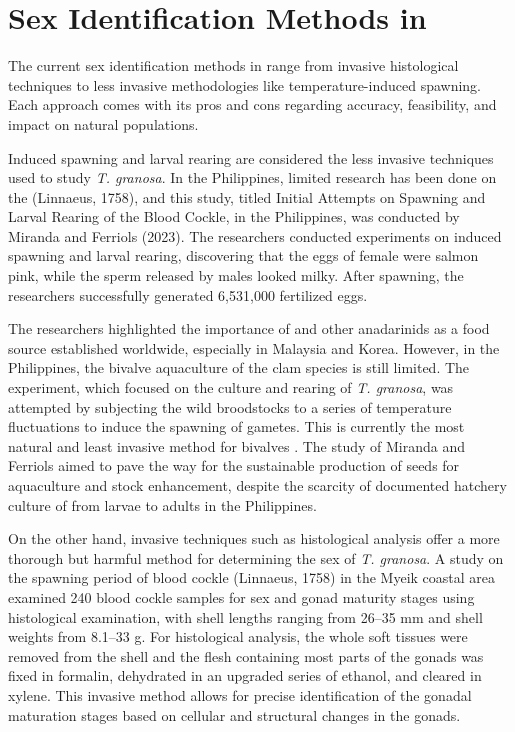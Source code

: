 {\section{Sex Identification Methods in \Tgranosa}

The current sex identification methods in \Tegillarcagranosa range from invasive histological techniques to less invasive methodologies like temperature-induced spawning. Each approach comes with its pros and cons regarding accuracy, feasibility, and impact on natural populations.

Induced spawning and larval rearing are considered the less invasive techniques used to study \textit{T. granosa}. In the Philippines, limited research has been done on the \Tgranosa (Linnaeus, 1758), and this study, titled Initial Attempts on Spawning and Larval Rearing of the Blood Cockle, \Tgranosa in the Philippines, was conducted by Miranda and Ferriols (2023). The researchers conducted experiments on induced spawning and larval rearing, discovering that the eggs of female \Tgranosa were salmon pink, while the sperm released by males looked milky. After spawning, the researchers successfully generated 6,531,000 fertilized eggs.

The researchers highlighted the importance of \Tgranosa and other anadarinids as a food source established worldwide, especially in Malaysia and Korea. However, in the Philippines, the bivalve aquaculture of the clam species is still limited. The experiment, which focused on the culture and rearing of \textit{T. granosa}, was attempted by subjecting the wild broodstocks to a series of temperature fluctuations to induce the spawning of gametes. This is currently the most natural and least invasive method for bivalves \cite{aji}. The study of Miranda and Ferriols aimed to pave the way for the sustainable production of \Tgranosa seeds for aquaculture and stock enhancement, despite the scarcity of documented hatchery culture of \Tgranosa from larvae to adults in the Philippines.

On the other hand, invasive techniques such as histological analysis offer a more thorough but harmful method for determining the sex of \textit{T. granosa}. A study on the spawning period of blood cockle \Tgranosa (Linnaeus, 1758) in the Myeik coastal area examined 240 blood cockle samples for sex and gonad maturity stages using histological examination, with shell lengths ranging from 26–35 mm and shell weights from 8.1–33 g. For histological analysis, the whole soft tissues were removed from the shell and the flesh containing most parts of the gonads was fixed in formalin, dehydrated in an upgraded series of ethanol, and cleared in xylene. This invasive method allows for precise identification of the gonadal maturation stages based on cellular and structural changes in the gonads.

}
